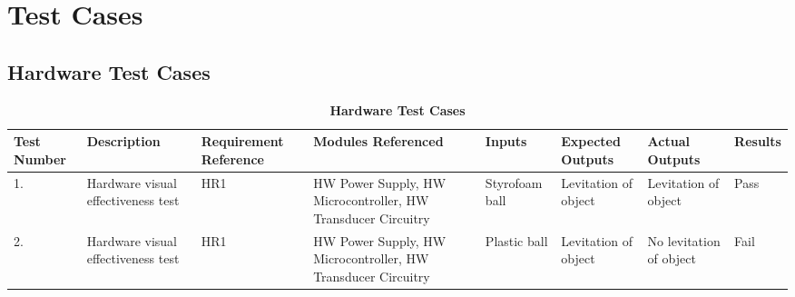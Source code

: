 \documentclass[12pt, titlepage]{article}
\begin{document}
\section{Test Cases}
\subsection{Hardware Test Cases}

\begin{table}[H]
\caption{\bf Hardware Test Cases}
\begin{tabular}{ |p{1cm}|p{2.2cm}|p{2.4cm}|p{2cm}|p{1.7cm}|p{1.7cm}|p{1.7cm}|p{1.3cm}|  } 
 \hline
\bf Test Number & \bf Description & \bf Requirement Reference & \bf Modules Referenced & \bf Inputs & \bf Expected Outputs & \bf Actual Outputs & \bf Results\\
 \hline
 1. & Hardware visual effectiveness test & HR1 & HW Power Supply, HW Microcontroller, HW Transducer Circuitry & Styrofoam ball & Levitation of object & Levitation of object & Pass\\
 \hline
 2. & Hardware visual effectiveness test & HR1 & HW Power Supply, HW Microcontroller, HW Transducer Circuitry & Plastic ball & Levitation of object & No levitation of object  & Fail\\
 \hline
\end{tabular}
\end{table}
\end{document}
